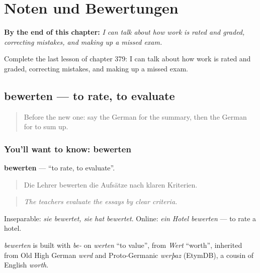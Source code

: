 
\chapter{Noten und Bewertungen}
\label{ch:ge-noten-und-bewertungen}

\begin{chapteropening}
\textbf{By the end of this chapter:} \emph{I can talk about how work is rated and graded, correcting mistakes, and making up a missed exam.}

Complete the last lesson of chapter 379: I can talk about how work is rated and graded, correcting mistakes, and making up a missed exam.
\end{chapteropening}

\section[bewerten]{bewerten — to rate, to evaluate}

\label{lesson:GE-C379-bewerten}



\begin{quote}
Before the new one: say the German for the summary, then the German for to sum up.
\end{quote}

\subsection*{You'll want to know: bewerten}
\textbf{bewerten} — \textquotedblleft{}to rate, to evaluate\textquotedblright{}.

\begin{quote}
Die Lehrer bewerten die Aufsätze nach klaren Kriterien.
\end{quote}

\begin{quote}
\emph{The teachers evaluate the essays by clear criteria.}
\end{quote}

Inseparable: \emph{sie bewertet, sie hat bewertet}. Online: \emph{ein Hotel bewerten} — to rate a hotel.

\begin{cousinweb}
\emph{bewerten} is built with \emph{be-} on \emph{werten} \textquotedblleft{}to value\textquotedblright{}, from \emph{Wert} \textquotedblleft{}worth\textquotedblright{}, inherited from Old High German \emph{werd} and Proto-Germanic \emph{werþaz} (EtymDB), a cousin of English \emph{worth}.
\end{cousinweb}

